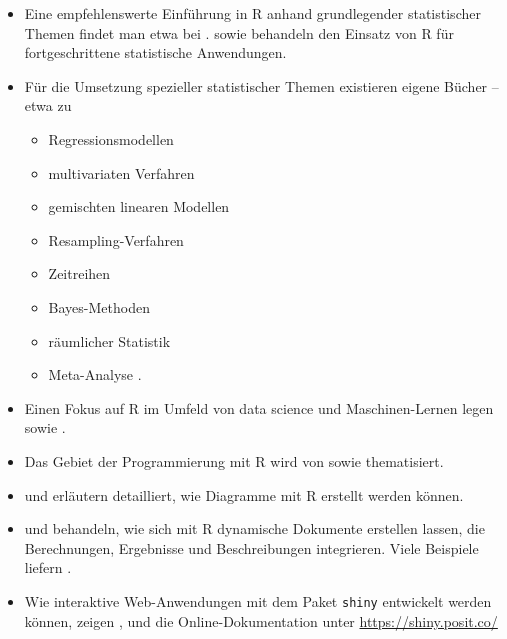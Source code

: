 \begin{itemize}
\item Eine empfehlenswerte Einführung in R anhand grundlegender statistischer Themen findet man etwa bei .  sowie  behandeln den Einsatz von R für fortgeschrittene statistische Anwendungen.
\item Für die Umsetzung spezieller statistischer Themen existieren eigene Bücher -- etwa zu
\begin{itemize}
\item Regressionsmodellen \cite{Fox2002,HarrellJr2001}
\item multivariaten Verfahren \cite{Zelterman2015}
\item gemischten linearen Modellen \cite{West2006,Pinheiro2000}
\item Resampling-Verfahren \cite{Chihara2011}
\item Zeitreihen \cite{Shumway2019,Shumway2006,Hyndman2019}
\item Bayes-Methoden \cite{McElreath2015,Kruschke2015}
\item räumlicher Statistik \cite{Pebesma2023}
\item Meta-Analyse \cite{Harrer2021,Schwarzer2015}.
\end{itemize}
\item Einen Fokus auf R im Umfeld von data science und Maschinen-Lernen legen  sowie .
\item Das Gebiet der Programmierung mit R wird von  sowie  thematisiert.
\item {} und  erläutern detailliert, wie Diagramme mit R erstellt werden können.
\item {} und  behandeln, wie sich mit R dynamische Dokumente erstellen lassen, die Berechnungen, Ergebnisse und Beschreibungen integrieren. Viele Beispiele liefern .
\item Wie interaktive Web-Anwendungen mit dem Paket \lstinline!shiny! \cite{RStudioShiny2014} entwickelt werden können, zeigen ,  und die Online-Dokumentation unter \url{https://shiny.posit.co/}
\end{itemize}

